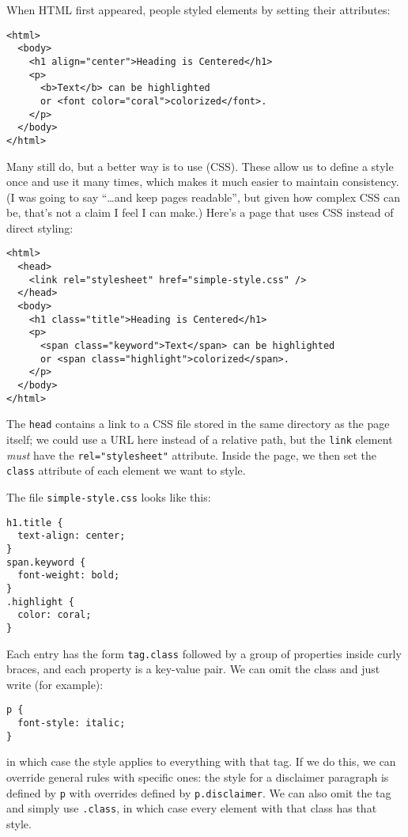 When HTML first appeared, people styled elements by setting their attributes:

\begin{verbatim}
<html>
  <body>
    <h1 align="center">Heading is Centered</h1>
    <p>
      <b>Text</b> can be highlighted
      or <font color="coral">colorized</font>.
    </p>
  </body>
</html>
\end{verbatim}

Many still do,
but a better way is to use  (CSS).
These allow us to define a style once and use it many times,
which makes it much easier to maintain consistency.
(I was going to say ``\ldots{}and keep pages readable'',
but given how complex CSS can be,
that's not a claim I feel I can make.)
Here's a page that uses CSS instead of direct styling:

\begin{verbatim}
<html>
  <head>
    <link rel="stylesheet" href="simple-style.css" />
  </head>
  <body>
    <h1 class="title">Heading is Centered</h1>
    <p>
      <span class="keyword">Text</span> can be highlighted
      or <span class="highlight">colorized</span>.
    </p>
  </body>
</html>
\end{verbatim}

The \texttt{head} contains a link to a CSS file stored in the same directory as the page itself;
we could use a URL here instead of a relative path,
but the \texttt{link} element \emph{must} have the \texttt{rel="stylesheet"} attribute.
Inside the page,
we then set the \texttt{class} attribute of each element we want to style.

The file \texttt{simple-style.css} looks like this:

\begin{verbatim}
h1.title {
  text-align: center;
}
span.keyword {
  font-weight: bold;
}
.highlight {
  color: coral;
}
\end{verbatim}

Each entry has the form \texttt{tag.class} followed by a group of properties inside curly braces,
and each property is a key-value pair.
We can omit the class and just write (for example):

\begin{verbatim}
p {
  font-style: italic;
}
\end{verbatim}

in which case the style applies to everything with that tag.
If we do this,
we can override general rules with specific ones:
the style for a disclaimer paragraph is defined by \texttt{p} with overrides defined by \texttt{p.disclaimer}.
We can also omit the tag and simply use \texttt{.class},
in which case every element with that class has that style.

